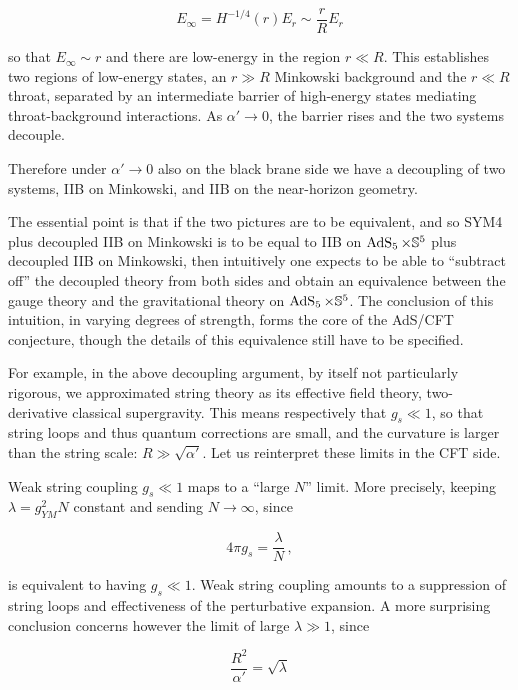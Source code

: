 \begin{equation}
	E_\infty = H^{-1/4}(r) E_r \sim \frac{r}{R} E_r
	\label{}
\end{equation}

so that $E_\infty \sim r$ and there are low-energy in the region $r \ll R$. This establishes two regions of low-energy states, an $r\gg R$ Minkowski background and the $r \ll R$ throat, separated by an intermediate barrier of high-energy states mediating throat-background interactions. As $\alpha' \rightarrow 0$, the barrier rises and the two systems decouple.

Therefore under $\alpha' \rightarrow 0$ also on the black brane side we have a decoupling of two systems, IIB on Minkowski, and IIB on the near-horizon geometry.

The essential point is that if the two pictures are to be equivalent, and so SYM4 plus decoupled IIB on Minkowski is to be equal to IIB on $\operatorname{AdS}_{5} \times \mathbb{S}^5$ plus decoupled IIB on Minkowski, then intuitively one expects to be able to ``subtract off'' the decoupled theory from both sides and obtain an equivalence between the gauge theory and the gravitational theory on $\operatorname{AdS}_{5} \times \mathbb{S}^5$. The conclusion of this intuition, in varying degrees of strength, forms the core of the AdS/CFT conjecture, though the details of this equivalence still have to be specified.

For example, in the above decoupling argument, by itself not particularly rigorous, we approximated string theory as its effective field theory, two-derivative classical supergravity. This means respectively that $g_s \ll 1$, so that string loops and thus quantum corrections are small, and the curvature is larger than the string scale: $R \gg \sqrt {\alpha'}$. Let us reinterpret these limits in the CFT side.

Weak string coupling $g_s \ll 1$ maps to a ``large $N$'' limit. More precisely, keeping $\lambda = g_{YM}^2 N$ constant and sending $N \rightarrow \infty$, since

\begin{equation}
	4\pi g_s = \frac{\lambda}{N}\,,
	\label{}
\end{equation}

is equivalent to having $g_s \ll 1$. Weak string coupling amounts to a suppression of string loops and effectiveness of the perturbative expansion. A more surprising conclusion concerns however the limit of large $\lambda \gg 1$, since

\begin{equation}
	\frac{R^2}{\alpha'} = \sqrt \lambda
	\label{}
\end{equation}

